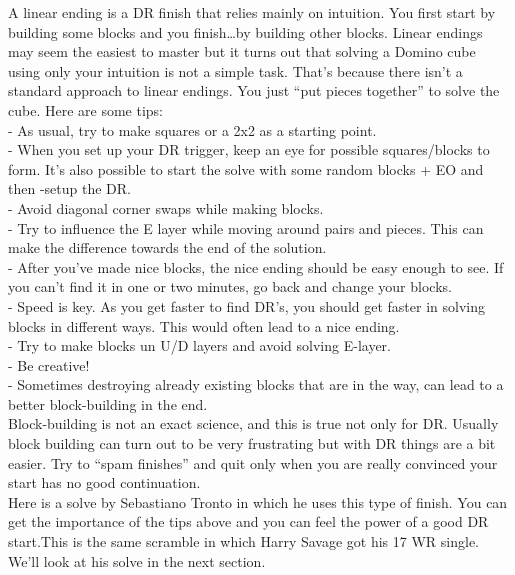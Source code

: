 \documentclass[11pt,a4paper]{book}
\begin{document}
A linear ending is a DR finish that relies mainly on intuition. You first start by building some blocks and you finish…by building other blocks. Linear endings may seem the easiest to master but it turns out that solving a Domino cube using only your intuition is not a simple task. That’s because there isn’t a standard approach to linear endings. You just “put pieces together” to solve the cube. Here are some tips:\\
\newline
- As usual, try to make squares or a 2x2 as a starting point. \\
- When you set up your DR trigger, keep an eye for possible squares/blocks to form. It’s also possible to start the solve with some random blocks + EO and then -setup the DR.\\
- Avoid diagonal corner swaps while making blocks.\\
- Try to influence the E layer while moving around pairs and pieces. This can make the difference towards the end of the solution.\\
- After you’ve made nice blocks, the nice ending should be easy enough to see. If you can’t find it in one or two minutes, go back and change your blocks.\\
- Speed is key. As you get faster to find DR’s, you should get faster in solving blocks in different ways. This would often lead to a nice ending.\\
- Try to make blocks un U/D layers and avoid solving E-layer.\\
- Be creative!\\
- Sometimes destroying already existing blocks that are in the way, can lead to a better block-building in the end.\\
\newline
Block-building is not an exact science, and this is true not only for DR. Usually block building can turn out to be very frustrating but with DR things are a bit easier. Try to “spam finishes” and quit only when you are really convinced your start has no good continuation. \\
\newline
Here is a solve by Sebastiano Tronto in which he uses this type of finish. You can get the importance of the tips above and you can feel the power of a good DR start.This is the same scramble in which Harry Savage got his 17 WR single. We’ll look at his solve in the next section.
\end{document}

